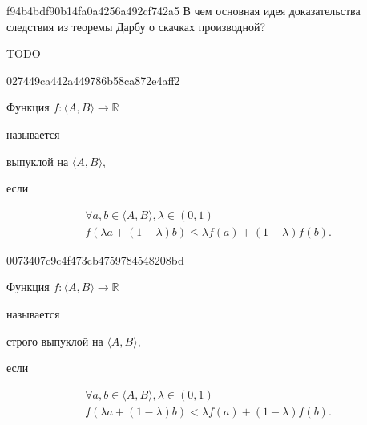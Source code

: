 
\begin{note}{f94b4bdf90b14fa0a4256a492cf742a5}
    В чем основная идея доказательства следствия из теоремы Дарбу о скачках производной?

    TODO
\end{note}

\begin{note}{027449ca442a449786b58ca872e4aff2}
    \begin{icloze}{3}Функция \( f : \langle A, B \rangle \to \mathbb R  \)\end{icloze} называется \begin{icloze}{2}выпуклой на \( \langle A, B \rangle  \),\end{icloze} если
    \begin{icloze}{1}\[
        \begin{gathered}
            \forall a, b \in \langle A, B \rangle, \lambda \in (0,1) \\
            f(\lambda a + (1 - \lambda)b) \leqslant \lambda f(a) + (1 - \lambda)f(b).
        \end{gathered}
    \]\end{icloze}
\end{note}

\begin{note}{0073407c9c4f473cb4759784548208bd}
    \begin{icloze}{3}Функция \( f : \langle A, B \rangle \to \mathbb R  \)\end{icloze} называется \begin{icloze}{2}строго выпуклой на \( \langle A, B \rangle  \),\end{icloze} если
    \begin{icloze}{1}\[
        \begin{gathered}
            \forall a, b \in \langle A, B \rangle, \lambda \in (0,1) \\
            f(\lambda a + (1 - \lambda)b) < \lambda f(a) + (1 - \lambda)f(b).
        \end{gathered}
    \]\end{icloze}
\end{note}


